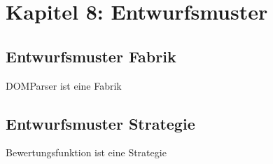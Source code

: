 \section{Kapitel 8: Entwurfsmuster}

\subsection{Entwurfsmuster Fabrik}

DOMParser ist eine Fabrik

\subsection{Entwurfsmuster Strategie}

Bewertungsfunktion ist eine Strategie